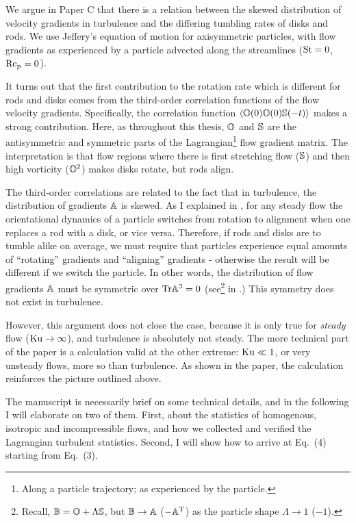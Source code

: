 \documentclass[thesis.tex]{subfiles}
\begin{document}
We argue in Paper C that there is a relation between the skewed distribution of velocity gradients in turbulence and the differing tumbling rates of disks and rods. We use Jeffery's equation of motion for axisymmetric particles, with flow gradients as experienced by a particle advected along the streamlines ($\mbox{St}=0$, $\mbox{Re}_{\mathrm p}=0$). 

It turns out that the first contribution to the rotation rate which is different for rods and disks comes from the third-order correlation functions of the flow velocity gradients. Specifically, the correlation function $\langle \mathbb{O}(0) \mathbb{O}(0) \mathbb{S}(-t)\rangle$ makes a strong contribution. Here, as throughout this thesis, $\mathbb{O}$ and $\mathbb{S}$ are the antisymmetric and symmetric parts of the Lagrangian\footnote{Along a particle trajectory; as experienced by the particle.} flow gradient matrix. The interpretation is that flow regions where there is first stretching flow ($\mathbb{S}$) and then high vorticity ($\mathbb{O}^2$) makes disks rotate, but rods align.

The third-order correlations are related to the fact that in turbulence, the distribution of gradients $\mathbb{A}$ is skewed. As I explained in , for any steady flow the orientational dynamics of a particle switches from rotation to alignment when one replaces a rod with a disk, or vice versa. Therefore, if rods and disks are to tumble alike on average, we must require that particles experience equal amounts of ``rotating'' gradients and ``aligning'' gradients - otherwise the result will be different if we switch the particle.
In other words, the distribution of flow gradients $\mathbb{A}$ must be symmetric over $\mbox{Tr} \mathbb{A}^3=0$ (see\footnote{Recall, $\mathbb{B}=\mathbb{O} + \Lambda\mathbb{S}$, but $\mathbb{B} \to \mathbb{A}$ ($-\mathbb{A}^{\mathrm T}$) as the particle shape $\Lambda\to 1$ ($-1$).}  in .) This symmetry does not exist in turbulence.

However, this argument does not close the case, because it is only true for \emph{steady} flow ($\mbox{Ku}\to\infty$), and turbulence is absolutely not steady. The more technical part of the paper is a calculation valid at the other extreme: $\mbox{Ku} \ll 1$, or very unsteady flows, more so than turbulence. As shown in the paper, the calculation reinforces the picture outlined above.

The manuscript is necessarily brief on some technical details, and in the following I will elaborate on two of them. First, about the statistics of homogenous, isotropic and incompressible flows, and how we collected and verified the Lagrangian turbulent statistics. Second, I will show how to arrive at Eq.~(4) starting from Eq.~(3).
\end{document}
